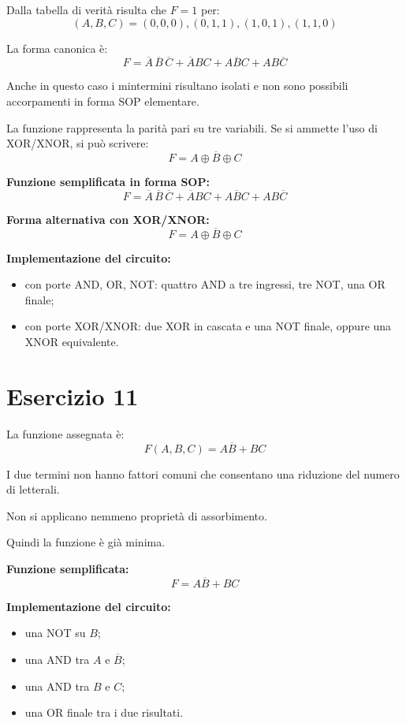 \documentclass[a4paper,12pt]{article}
\begin{document}
	Dalla tabella di verità risulta che $F=1$ per:
	\[
	(A,B,C)=(0,0,0),(0,1,1),(1,0,1),(1,1,0)
	\]
	
	La forma canonica è:
	\[
	F=\overline{A}\,\overline{B}\,\overline{C}+\overline{A}BC+A\overline{B}C+AB\overline{C}
	\]
	
	Anche in questo caso i mintermini risultano isolati e non sono possibili accorpamenti in forma SOP elementare.
	
	La funzione rappresenta la parità pari su tre variabili. Se si ammette l'uso di XOR/XNOR, si può scrivere:
	\[
	F=\overline{A\oplus B\oplus C}
	\]
	
	\textbf{Funzione semplificata in forma SOP:}
	\[
	\boxed{F=\overline{A}\,\overline{B}\,\overline{C}+\overline{A}BC+A\overline{B}C+AB\overline{C}}
	\]
	
	\textbf{Forma alternativa con XOR/XNOR:}
	\[
	\boxed{F=\overline{A\oplus B\oplus C}}
	\]
	
	\textbf{Implementazione del circuito:}
	\begin{itemize}
		\item con porte AND, OR, NOT: quattro AND a tre ingressi, tre NOT, una OR finale;
		\item con porte XOR/XNOR: due XOR in cascata e una NOT finale, oppure una XNOR equivalente.
	\end{itemize}
	
	\bigskip
	
	\section*{Esercizio 11}
	
	La funzione assegnata è:
	\[
	F(A,B,C)=A\overline{B}+BC
	\]
	
	I due termini non hanno fattori comuni che consentano una riduzione del numero di letterali.
	
	Non si applicano nemmeno proprietà di assorbimento.
	
	Quindi la funzione è già minima.
	
	\textbf{Funzione semplificata:}
	\[
	\boxed{F=A\overline{B}+BC}
	\]
	
	\textbf{Implementazione del circuito:}
	\begin{itemize}
		\item una NOT su $B$;
		\item una AND tra $A$ e $\overline{B}$;
		\item una AND tra $B$ e $C$;
		\item una OR finale tra i due risultati.
	\end{itemize}
	
\end{document}
